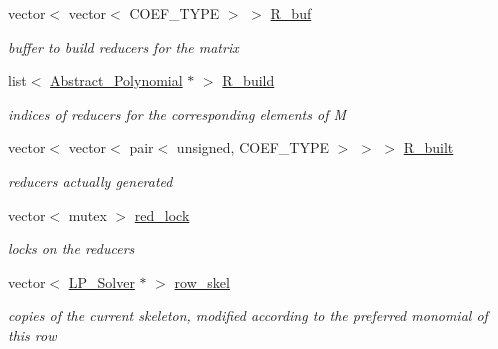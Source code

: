 \begin{DoxyCompactItemize}
vector$<$ vector$<$ C\+O\+E\+F\+\_\+\+T\+Y\+PE $>$ $>$ \hyperlink{group___g_b_computation_ae715f7601d5f828b58f59c8ef15748fb}{R\+\_\+buf}
\begin{DoxyCompactList}\small\item\em buffer to build reducers for the matrix \end{DoxyCompactList}\item 
\mbox{\label{group___g_b_computation_a03bda496da1d09c73151ba42b6db7bc4}} 
list$<$ \hyperlink{group__polygroup_class_abstract___polynomial}{Abstract\+\_\+\+Polynomial} $\ast$ $>$ \hyperlink{group___g_b_computation_a03bda496da1d09c73151ba42b6db7bc4}{R\+\_\+build}
\begin{DoxyCompactList}\small\item\em indices of reducers for the corresponding elements of {\ttfamily M} \end{DoxyCompactList}\item 
\mbox{\label{group___g_b_computation_a341e74dadaec6a56cd944f17be9b9320}} 
vector$<$ vector$<$ pair$<$ unsigned, C\+O\+E\+F\+\_\+\+T\+Y\+PE $>$ $>$ $>$ \hyperlink{group___g_b_computation_a341e74dadaec6a56cd944f17be9b9320}{R\+\_\+built}
\begin{DoxyCompactList}\small\item\em reducers actually generated \end{DoxyCompactList}\item 
\mbox{\label{group___g_b_computation_abfbe5a1e5b64e6512e885077a9b4b6b0}} 
vector$<$ mutex $>$ \hyperlink{group___g_b_computation_abfbe5a1e5b64e6512e885077a9b4b6b0}{red\+\_\+lock}
\begin{DoxyCompactList}\small\item\em locks on the reducers \end{DoxyCompactList}\item 
\mbox{\label{group___g_b_computation_a9e8822d7ececb2271ebbef4ec62f986e}} 
vector$<$ \hyperlink{group___c_l_s_solvers_class_l_p___solvers_1_1_l_p___solver}{L\+P\+\_\+\+Solver} $\ast$ $>$ \hyperlink{group___g_b_computation_a9e8822d7ececb2271ebbef4ec62f986e}{row\+\_\+skel}
\begin{DoxyCompactList}\small\item\em copies of the current skeleton, modified according to the preferred monomial of this row \end{DoxyCompactList}\item 

\end{DoxyCompactItemize}
